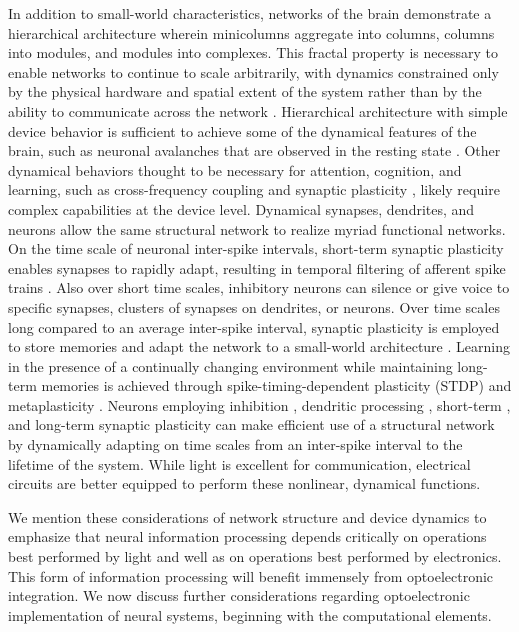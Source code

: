 \documentclass[twocolumn]{article}
\begin{document}
In addition to small-world characteristics, networks of the brain demonstrate a hierarchical architecture wherein minicolumns aggregate into columns, columns into modules, and modules into complexes. This fractal property is necessary to enable networks to continue to scale arbitrarily, with dynamics constrained only by the physical hardware and spatial extent of the system rather than by the ability to communicate across the network \cite{plth2006}.  Hierarchical architecture with simple device behavior is sufficient to achieve some of the dynamical features of the brain, such as neuronal avalanches \cite{be2007,frla2013} that are observed in the resting state \cite{peth2009}. Other dynamical behaviors thought to be necessary for attention, cognition, and learning, such as cross-frequency coupling \cite{heze2010} and synaptic plasticity \cite{somi2000,mage2012,ab2008,fudr2005}, likely require complex capabilities at the device level. Dynamical synapses, dendrites, and neurons allow the same structural network to realize myriad functional networks. On the time scale of neuronal inter-spike intervals, short-term synaptic plasticity enables synapses to rapidly adapt, resulting in temporal filtering of afferent spike trains \cite{abre2004}. Also over short time scales, inhibitory neurons can silence or give voice to specific synapses, clusters of synapses on dendrites, or neurons. Over time scales long compared to an average inter-spike interval, synaptic plasticity is employed to store memories and adapt the network to a small-world architecture \cite{shki2006}. Learning in the presence of a continually changing environment while maintaining long-term memories is achieved through spike-timing-dependent plasticity (STDP) \cite{somi2000,mage2012} and metaplasticity \cite{fudr2005,ab2008}. Neurons employing inhibition \cite{budr2004}, dendritic processing \cite{haah2015,stsp2015,sava2017}, short-term \cite{abre2004}, and long-term synaptic plasticity \cite{somi2000,mage2012,ab2008,fudr2005} can make efficient use of a structural network by dynamically adapting on time scales from an inter-spike interval to the lifetime of the system. While light is excellent for communication, electrical circuits are better equipped to perform these nonlinear, dynamical functions. 

We mention these considerations of network structure and device dynamics to emphasize that neural information processing depends critically on operations best performed by light and well as on operations best performed by electronics. This form of information processing will benefit immensely from optoelectronic integration. We now discuss further considerations regarding optoelectronic implementation of neural systems, beginning with the computational elements.
\end{document}
